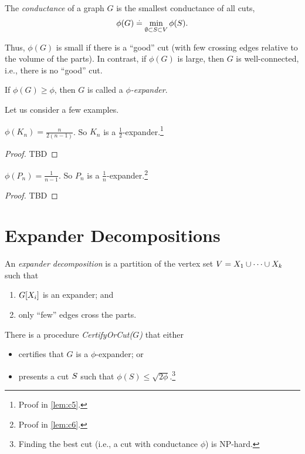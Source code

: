 \begin{defn}The \emph{conductance} of a graph $G$ is the smallest conductance of all cuts, \begin{align}
    \phi(G) \overset{.}{=} \min_{\emptyset \subset S \subset V} \phi(S).
\end{align}
\end{defn} Thus, $\phi(G)$ is small if there is a ``good'' cut (with few crossing edges relative to the volume of the parts). In contrast, if $\phi(G)$ is large, then $G$ is well-connected, i.e., there is no ``good'' cut.

\begin{defn}[Expander] If $\phi(G) \geq \phi$, then $G$ is called a \emph{$\phi$-expander}.
\end{defn}

Let us consider a few examples.

\begin{lem}
$\phi(K_n) = \frac{n}{2(n-1)}$. So $K_n$ is a $\frac{1}{2}$-expander.\footnote{Proof in \cref{lem:c5}.}
\end{lem}
\begin{proof}
TBD
\end{proof}

\begin{lem}
$\phi(P_n) = \frac{1}{n-1}$. So $P_n$ is a $\frac{1}{n}$-expander.\footnote{Proof in \cref{lem:c6}.}
\end{lem}
\begin{proof}
TBD
\end{proof}

\section{Expander Decompositions}

\begin{defn} An \emph{expander decomposition} is a partition of the vertex set $V = X_1 \cup \dots \cup X_k$ such that \begin{enumerate}
    \item $G[X_i]$ is an expander; and
    \item only ``few'' edges cross the parts.
\end{enumerate}
\end{defn}\noindent There is a procedure \emph{CertifyOrCut($G$)} that either \begin{itemize}
    \item certifies that $G$ is a $\phi$-expander; or
    \item presents a cut $S$ such that $\phi(S) \leq \sqrt{2\phi}$.\footnote{Finding the best cut (i.e., a cut with conductance $\phi$) is NP-hard.}
\end{itemize}


